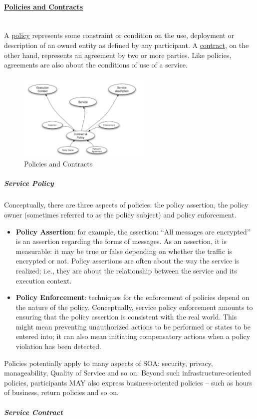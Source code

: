 \documentclass[10pt,a4paper]{article}
\newcommand{\myparagraph}[1]{\paragraph{\uline{#1}}\mbox{}\\[0.05in]}
\begin{document}
\pagebreak
\myparagraph{Policies and Contracts}
A \uline{policy} represents some constraint or condition on the use, deployment or description of an owned entity as defined by any participant. A \uline{contract}, on the other hand, represents an agreement by two or more parties. Like policies, agreements are also about the conditions of use of a service.
\begin{figure}[h!]
 \hfill \includegraphics[width=180pt]{images/policies-contracts}\hspace*{\fill}
  \caption{Policies and Contracts}
  \label{fig:policies-and-contracts}
\end{figure}
\subparagraph{Service Policy}
Conceptually, there are three aspects of policies: the policy assertion, the policy owner (sometimes referred to as the policy subject) and policy enforcement.
\begin{itemize}
	\item \textbf{Policy Assertion}: for example, the assertion: “All messages are encrypted” is an assertion regarding the forms of messages. As an assertion, it is measurable: it may be true or false depending on whether the traffic is encrypted or not. Policy assertions are often about the way the service is realized; i.e., they are about the relationship between the service and its execution context.
	\item \textbf{Policy Enforcement}: techniques for the enforcement of policies depend on the nature of the policy. Conceptually, service policy enforcement amounts to ensuring that the policy assertion is consistent with the real world. This might mean preventing unauthorized actions to be performed or states to be entered into; it can also mean initiating compensatory actions when a policy violation has been detected.
\end{itemize}
Policies potentially apply to many aspects of SOA: security, privacy, manageability, Quality of Service and so on. Beyond such infrastructure-oriented policies, participants MAY also express business-oriented policies – such as hours of business, return policies and so on.
\subparagraph{Service Contract}
\end{document}
